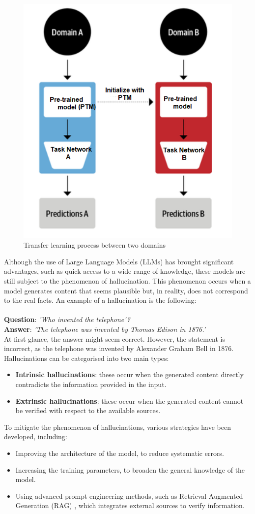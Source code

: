 \begin{figure}[h]
    \centering
    \includegraphics[width=0.7\linewidth]{Figures/Transferlearning.png}
    \caption{Transfer learning process between two domains \cite{vitalfluxNLP}}
    \label{fig:graph}
\end{figure}
Although the use of Large Language Models (LLMs) has brought significant advantages, such as quick access to a wide range of knowledge, these models are still subject to the phenomenon of hallucination. This phenomenon occurs when a model generates content that seems plausible but, in reality, does not correspond to the real facts.
An example of a hallucination is the following:\\
\\
\textbf{Question}: \textit{'Who invented the telephone'?}\\
\textbf{Answer}: \textit{'The telephone was invented by Thomas Edison in 1876.'}
\\
At first glance, the answer might seem correct. However, the statement is incorrect, as the telephone was invented by Alexander Graham Bell in 1876.
Hallucinations can be categorised into two main types\cite{Hallucination}:
\begin{itemize}
    \item \textbf{Intrinsic hallucinations}: these occur when the generated content directly contradicts the information provided in the input.
    \item \textbf{Extrinsic hallucinations}: these occur when the generated content cannot be verified with respect to the available sources. 
\end{itemize}
To mitigate the phenomenon of hallucinations, various strategies have been developed, including:\\
\begin{itemize}
    \item Improving the architecture of the model, to reduce systematic errors.
    \item Increasing the training parameters, to broaden the general knowledge of the model.
    \item Using advanced prompt engineering methods, such as Retrieval-Augmented Generation (RAG) \cite{Rag}, which integrates external sources to verify information.
\end{itemize}
